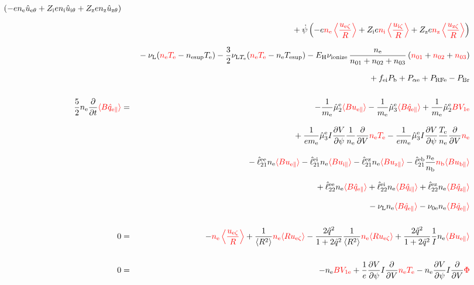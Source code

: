 \documentclass[11pt]{article}
\def\r#1{{\rm#1}}
\def\ave#1{\left\langle#1\right\rangle}
\def\aves#1{\langle#1\rangle}
\def\dd#1#2{\frac{\partial #1}{\partial #2}}
\def\para{\parallel}
\def\ddV{\frac{\partial}{\partial V}}
\def\ddt{\frac{\partial}{\partial t}}
\def\me{m_\r{e}}
\def\mb{m_\r{b}}
\def\nee{n_\r{e}}
\def\ni{n_\r{i}}
\def\nz{n_\r{z}}
\def\nb{n_\r{b}}
\def\Te{T_\r{e}}
\def\Zi{Z_\r{i}}
\def\Zz{Z_\r{z}}
\def\uzt#1{u_{\r{#1}\zeta}}
\def\upara#1{u_{\r{#1}\para}}
\def\uhatth#1{\hat{u}_{\r{#1}\theta}}
\def\qhatpara#1{\hat{q}_{\r{#1}\para}}
\def\nun#1{\nu_\r{0#1}}
\def\nsup#1{n_\r{#1sup}}
\def\Tsup#1{T_\r{#1sup}}
\def\nuLT#1{\nu_{\r{L}T_\r{#1}}}
\def\PRF#1{P_\r{RF#1}}
\def\Palp#1{P_{\alpha\r{#1}}}
\def\fei{f_\r{ei}}
\def\PBr{P_\r{Br}}
\def\Pb{P_\r{b}}
\def\Eb{E_\r{b}}
\def\EH{E_\r{H}}
\def\nna{n_{01}}
\def\nnb{n_{02}}
\def\nnc{n_{03}}
\def\nuL{\nu_\r{L}}
\def\nuion{\nu_\r{ionize}}
\def\red#1{\textcolor{red}{#1}}
\begin{document}
\begin{eqnarray}
  (-    e \nee \uhatth{e} + \Zi e \ni  \uhatth{i} + \Zz e \nz  \uhatth{z})
%
\nonumber\\[2.5mm]&&{}
%
  +\dot{\psi}\left(-     e \red{\nee \ave{\frac{\uzt{e}}{R}}}
	           + \Zi e \red{\ni  \ave{\frac{\uzt{i}}{R}}}
	           + \Zz e \red{\nz  \ave{\frac{\uzt{z}}{R}}}\right)
\nonumber\\[2.5mm]&&{}
%
  - \nuL (\red{\nee\Te} - \nsup{e}\Te)
%
  - \frac{3}{2} \nuLT{e} (\red{\nee\Te} - \nee\Tsup{e})
%
  - \EH \nuion\, \frac{\nee}{\nna + \nnb + \nnc}\, (\red{\nna} + \red{\nnb} + \red{\nnc})
\nonumber\\[2.5mm]&&{}
%
  + \fei \Pb
%
%
  + \Palp{e}
%
  + \PRF{e}
%
  - \PBr
\\[5mm]
 \frac{5}{2} \nee \ddt \red{\aves{B \qhatpara{e}}} &=&
%
  - \frac{1}{\me} \hat{\mu}_2^\r{e} \red{\aves{B \upara{e}}}
  - \frac{1}{\me} \hat{\mu}_3^\r{e} \red{\aves{B \qhatpara{e}}}
%
  + \frac{1}{\me} \hat{\mu}_2^\r{e} \red{B V_{1\r{e}}}
\nonumber\\[3mm]&&{}
%
  + \frac{1}{e\me} \hat{\mu}_3^\r{e} I \dd{V}{\psi} \frac{1}{\nee} \ddV
  \red{\nee \Te}
  - \frac{1}{e\me} \hat{\mu}_3^\r{e} I \dd{V}{\psi} \frac{\Te}{\nee} \ddV
  \red{\nee}
\nonumber\\[3mm]&&{}
%
  - \hat{\ell}_{21}^{\r{ee}} \nee \red{\aves{B \upara{e}}}
  - \hat{\ell}_{21}^{\r{ei}} \nee \red{\aves{B \upara{i}}}
  - \hat{\ell}_{21}^{\r{ez}} \nee \red{\aves{B \upara{z}}}
  - \hat{\ell}_{21}^{\r{eb}} \frac{\nee}{\nb} \red{\nb \aves{B \upara{b}}}
\nonumber\\[3mm]&&{}
%
  + \hat{\ell}_{22}^{\r{ee}} \nee \red{\aves{B \qhatpara{e}}}
  + \hat{\ell}_{22}^{\r{ei}} \nee \red{\aves{B \qhatpara{i}}}
  + \hat{\ell}_{22}^{\r{ez}} \nee \red{\aves{B \qhatpara{z}}}
\nonumber\\[3mm]&&{}
%
  - \nuL \nee \red{\aves{B \qhatpara{e}}}
%
  - \nun{e} \nee \red{\aves{B \qhatpara{e}}}
\\[5mm]
    0 &=&
%
  - \red{\nee \ave{\frac{\uzt{e}}{R}}}
%
  + \frac{1}{\aves{R^2}} \red{\nee \aves{R\uzt{e}}}
%
  - \frac{2\hat{q}^2}{1+2\hat{q}^2} \frac{1}{\aves{R^2}}\red{\nee\aves{R\uzt{e}}}
%
  + \frac{2\hat{q}^2}{1+2\hat{q}^2} \frac{1}{I}\nee \red{\aves{B\upara{e}}}
\\[5mm]
    0 &=&
%
  - \nee \red{BV_{1\r{e}}}
%
  + \frac{1}{e} \dd{V}{\psi} I \ddV \red{\nee\Te}
%
  - \nee \dd{V}{\psi} I \ddV \red{\Phi}
\end{eqnarray}
%
\end{document}
